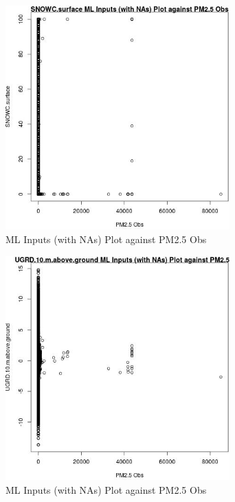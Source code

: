 \begin{figure} 
\centering  
\includegraphics[width=0.77\textwidth]{Code_Outputs/Report_ML_input_PM25_Step4_part_f_de_duplicated_aveswNAs_SNOWCsurfacevPM25_Obs.jpg} 
\caption{\label{fig:Report_ML_input_PM25_Step4_part_f_de_duplicated_aveswNAsSNOWCsurfacevPM25_Obs}ML Inputs (with NAs) Plot against PM2.5 Obs} 
\end{figure} 
 

\begin{figure} 
\centering  
\includegraphics[width=0.77\textwidth]{Code_Outputs/Report_ML_input_PM25_Step4_part_f_de_duplicated_aveswNAs_UGRD10mabovegroundvPM25_Obs.jpg} 
\caption{\label{fig:Report_ML_input_PM25_Step4_part_f_de_duplicated_aveswNAsUGRD10mabovegroundvPM25_Obs}ML Inputs (with NAs) Plot against PM2.5 Obs} 
\end{figure} 
 

